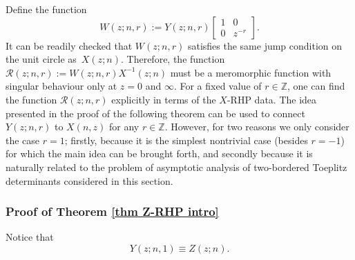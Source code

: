 \documentclass[pdftex]{sigma}
\numberwithin{equation}{section}
\newcommand{\Z}{{\mathbb Z}}
\begin{document}
	Define the function
	\begin{equation}\label{WY}
		W(z;n,r):= Y(z;n,r) \begin{bmatrix}
			1 & 0 \\
			0 & z^{-r}
		\end{bmatrix}.
	\end{equation}
	It can be readily checked that $W(z;n,r)$ satisfies the same jump condition on the unit circle as~$X(z;n)$. Therefore, the function $\mathscr{R}(z;n,r) := W(z;n,r)X^{-1}(z;n)$
	must be a meromorphic function with singular behaviour only at $z=0$ and $\infty$. For a fixed value of $r \in \Z$, one can find the function $\mathscr{R}(z;n,r)$ explicitly in terms of the $X$-RHP data. The idea presented in the proof of the following theorem can be used to connect $Y(z;n,r)$ to $X(n,z)$ for any $r \in \Z$. However, for two reasons we only consider the case $r=1$; firstly, because it is the simplest nontrivial case (besides $r=-1$) for which the main idea can be brought forth, and secondly because it is naturally related to the problem of asymptotic analysis of two-bordered Toeplitz determinants considered in this section.
	
\subsubsection{Proof of Theorem \ref{thm Z-RHP intro}}\label{sec proof of thm 1.6}
	Notice that
	\begin{equation}\label{YZ}
		Y(z;n,1) \equiv Z(z;n).
	\end{equation}
	
\end{document}
